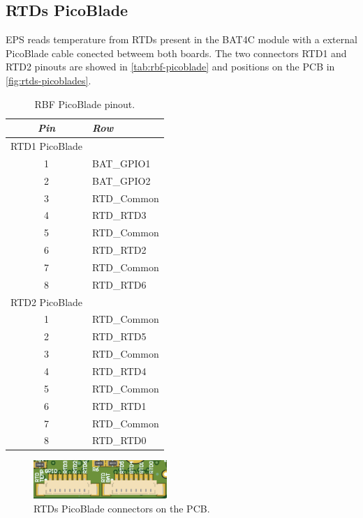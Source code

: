 \subsection{RTDs PicoBlade} \label{rtd-picoblade}

EPS reads temperature from RTDs present in the BAT4C module with a external PicoBlade cable conected betweem both boards. The two connectors RTD1 and RTD2 pinouts are showed in \autoref{tab:rbf-picoblade} and positions on the PCB in \autoref{fig:rtds-picoblades}.

\begin{table}[!h]
    \centering
    \begin{tabular}{cl}
        \toprule[1.5pt]
        \textit{Pin} & \textit{Row} \\
        \midrule
        RTD1 PicoBlade &  \\
        \midrule
        1            & BAT\_GPIO1   \\
        2            & BAT\_GPIO2   \\
        3            & RTD\_Common  \\
        4            & RTD\_RTD3    \\
        5            & RTD\_Common  \\
        6            & RTD\_RTD2    \\
        7            & RTD\_Common  \\
        8            & RTD\_RTD6    \\
        \midrule
        RTD2 PicoBlade &  \\
        \midrule
        1            & RTD\_Common  \\
        2            & RTD\_RTD5    \\
        3            & RTD\_Common  \\
        4            & RTD\_RTD4    \\
        5            & RTD\_Common  \\
        6            & RTD\_RTD1    \\
        7            & RTD\_Common  \\
        8            & RTD\_RTD0    \\
        \bottomrule[1.5pt]
    \end{tabular}
    \caption{RBF PicoBlade pinout.}
    \label{tab:rbf-picoblade}
\end{table}

\begin{figure}[!ht]
    \begin{center}
        \includegraphics[width=0.45\textwidth]{figures/rtds-picoblades-3d.png}
        \caption{RTDs PicoBlade connectors on the PCB.}
        \label{fig:rtds-picoblades}
    \end{center}
\end{figure}

